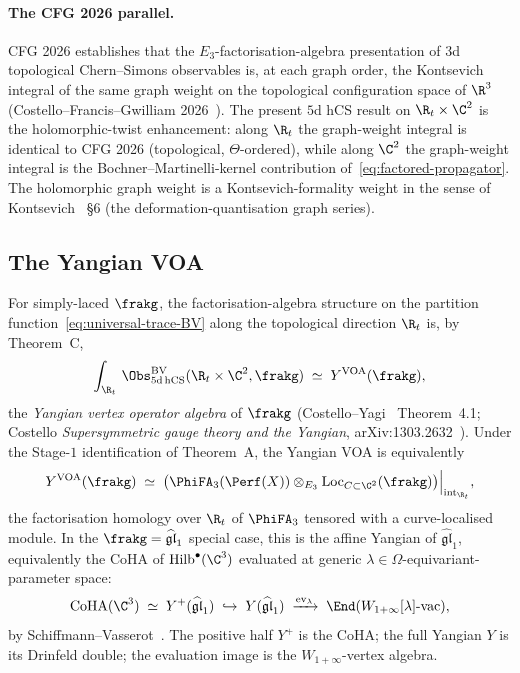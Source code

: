 \paragraph{The CFG 2026 parallel.}
CFG 2026 establishes that the $E_3$-factorisation-algebra presentation
of $3$d topological Chern--Simons observables is, at each graph order,
the Kontsevich integral of the same graph weight on the topological
configuration space of $\R^3$ (Costello--Francis--Gwilliam
2026~\cite{CFG2026}). The present $5$d hCS result on
$\R_t\times\C^2$ is the holomorphic-twist enhancement: along $\R_t$
the graph-weight integral is identical to CFG 2026 (topological,
$\Theta$-ordered), while along $\C^2$ the graph-weight integral is
the Bochner--Martinelli-kernel contribution of~\eqref{eq:factored-propagator}.
The holomorphic graph weight is a Kontsevich-formality weight in the
sense of Kontsevich~\cite{Kontsevich1999} §6 (the deformation-quantisation
graph series).

\subsection*{The Yangian VOA}

For simply-laced $\frakg$, the factorisation-algebra structure on the
partition function~\eqref{eq:universal-trace-BV} along the topological
direction $\R_t$ is, by Theorem~C,
\begin{equation}
\label{eq:yangian-voa}
  \int_{\R_t}\, \Obs^{\mathrm{BV}}_{5\mathrm{d\,hCS}}(\R_t\times\C^2,\frakg)
  \;\simeq\; Y^{\mathrm{VOA}}(\frakg),
\end{equation}
the \emph{Yangian vertex operator algebra} of $\frakg$
(Costello--Yagi~\cite{CostelloYagi2018} Theorem~4.1; Costello
\emph{Supersymmetric gauge theory and the Yangian},
arXiv:1303.2632~\cite{Costello2013}). Under the Stage-$1$
identification of Theorem~A, the Yangian VOA is equivalently
\begin{equation}
\label{eq:yangian-voa-stage-1}
  Y^{\mathrm{VOA}}(\frakg) \;\simeq\;
  \bigl(\PhiFA_3(\Perf(X)) \otimes_{E_3} \mathrm{Loc}_{C\subset\C^2}(\frakg)\bigr)\Big|_{\mathrm{int}_{\R_t}},
\end{equation}
the factorisation homology over $\R_t$ of $\PhiFA_3$ tensored with a
curve-localised module. In the $\frakg = \widehat{\mathfrak{gl}}_1$
special case, this is the affine Yangian of $\widehat{\mathfrak{gl}}_1$,
equivalently the CoHA of $\mathrm{Hilb}^\bullet(\C^3)$ evaluated at
generic $\lambda \in \Omega$-equivariant-parameter space:
\begin{equation}
\label{eq:affine-yangian-coha}
  \mathrm{CoHA}(\C^3) \;\simeq\; Y^+(\widehat{\mathfrak{gl}}_1)
  \;\hookrightarrow\; Y(\widehat{\mathfrak{gl}}_1)
  \;\xrightarrow{\mathrm{ev}_\lambda}\; \End(W_{1+\infty}[\lambda]\text{-}\mathrm{vac}),
\end{equation}
by Schiffmann--Vasserot~\cite{SchiffmannVasserot2013}. The positive
half $Y^+$ is the CoHA; the full Yangian $Y$ is its Drinfeld double;
the evaluation image is the $W_{1+\infty}$-vertex algebra.


